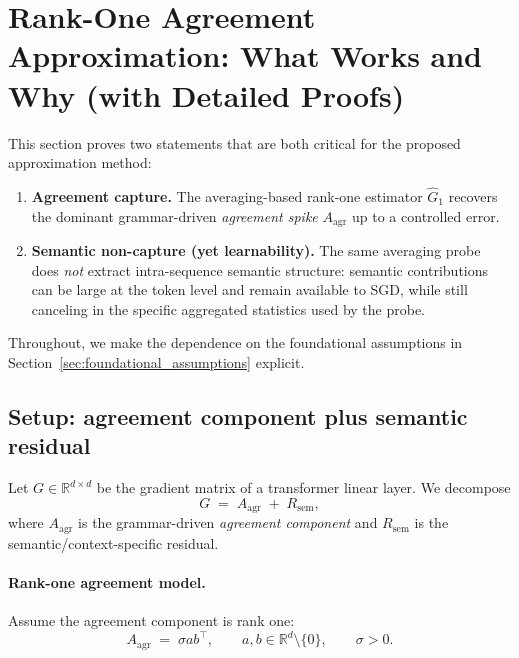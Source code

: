\section{Rank-One Agreement Approximation: What Works and Why (with Detailed Proofs)}
\label{sec:rank_one_agreement}

This section proves two statements that are both critical for the proposed approximation method:

\begin{enumerate}
    \item \textbf{Agreement capture.} The averaging-based rank-one estimator
    $\widehat{G}_1$ recovers the dominant grammar-driven \emph{agreement spike}
    $A_{\mathrm{agr}}$ up to a controlled error.
    \item \textbf{Semantic non-capture (yet learnability).} The same averaging probe
    does \emph{not} extract intra-sequence semantic structure: semantic contributions can be
    large at the token level and remain available to SGD, while still canceling in the
    specific aggregated statistics used by the probe.
\end{enumerate}

Throughout, we make the dependence on the foundational assumptions in
Section~\ref{sec:foundational_assumptions} explicit.

\subsection{Setup: agreement component plus semantic residual}
\label{sec:rank_one_setup}

Let $G\in\mathbb{R}^{d\times d}$ be the gradient matrix of a transformer linear layer.
We decompose
\begin{equation}
\label{eq:rank_one_decomp}
G \;=\; A_{\mathrm{agr}} \;+\; R_{\mathrm{sem}},
\end{equation}
where $A_{\mathrm{agr}}$ is the grammar-driven \emph{agreement component} and $R_{\mathrm{sem}}$
is the semantic/context-specific residual.

\paragraph{Rank-one agreement model.}
Assume the agreement component is rank one:
\begin{equation}
\label{eq:rank_one_A}
A_{\mathrm{agr}} \;=\; \sigma a b^\top,
\qquad
a,b\in\mathbb{R}^d\setminus\{0\},
\qquad
\sigma>0.
\end{equation}

